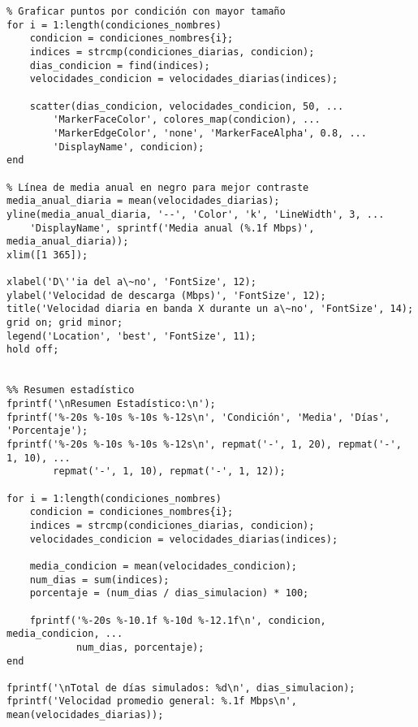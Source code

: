 \begin{verbatim}
% Graficar puntos por condición con mayor tamaño
for i = 1:length(condiciones_nombres)
    condicion = condiciones_nombres{i};
    indices = strcmp(condiciones_diarias, condicion);
    dias_condicion = find(indices);
    velocidades_condicion = velocidades_diarias(indices);
    
    scatter(dias_condicion, velocidades_condicion, 50, ...
        'MarkerFaceColor', colores_map(condicion), ...
        'MarkerEdgeColor', 'none', 'MarkerFaceAlpha', 0.8, ...
        'DisplayName', condicion);
end

% Línea de media anual en negro para mejor contraste
media_anual_diaria = mean(velocidades_diarias);
yline(media_anual_diaria, '--', 'Color', 'k', 'LineWidth', 3, ...
    'DisplayName', sprintf('Media anual (%.1f Mbps)', media_anual_diaria));
xlim([1 365]);

xlabel('D\''ia del a\~no', 'FontSize', 12);
ylabel('Velocidad de descarga (Mbps)', 'FontSize', 12);
title('Velocidad diaria en banda X durante un a\~no', 'FontSize', 14);
grid on; grid minor;
legend('Location', 'best', 'FontSize', 11);
hold off;


%% Resumen estadístico
fprintf('\nResumen Estadístico:\n');
fprintf('%-20s %-10s %-10s %-12s\n', 'Condición', 'Media', 'Días', 'Porcentaje');
fprintf('%-20s %-10s %-10s %-12s\n', repmat('-', 1, 20), repmat('-', 1, 10), ...
        repmat('-', 1, 10), repmat('-', 1, 12));

for i = 1:length(condiciones_nombres)
    condicion = condiciones_nombres{i};
    indices = strcmp(condiciones_diarias, condicion);
    velocidades_condicion = velocidades_diarias(indices);
    
    media_condicion = mean(velocidades_condicion);
    num_dias = sum(indices);
    porcentaje = (num_dias / dias_simulacion) * 100;
    
    fprintf('%-20s %-10.1f %-10d %-12.1f\n', condicion, media_condicion, ...
            num_dias, porcentaje);
end

fprintf('\nTotal de días simulados: %d\n', dias_simulacion);
fprintf('Velocidad promedio general: %.1f Mbps\n', mean(velocidades_diarias));



\end{verbatim}